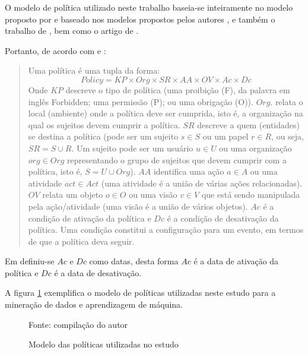 O modelo de política utilizado neste trabalho baseia-se inteiramente no modelo proposto por \cite{sarkis2017} e \cite{sarkis:artigo:2016} baseado nos modelos propostos pelos autores \cite{cuppens_high_2007}, e também o trabalho de \cite{elrakaiby_formal_2012}, bem como o artigo de \cite{kalam_organization_2003}.

Portanto, de acordo com \cite[p.36]{sarkis2017} e \cite{sarkis:artigo:2016}:
\begin{quotation}
	Uma política é uma tupla da forma:
	\begin{equation}\label{politica}
	Policy = KP \times Org \times SR \times AA \times OV \times Ac \times Dc
	\end{equation}
	Onde $ KP $ descreve o tipo de política (uma proibição (F), da palavra em inglês Forbidden; uma permissão (P); ou uma obrigação (O)). $ Org $. relata o local (ambiente) onde a política deve ser cumprida, isto é, a organização na qual os sujeitos devem cumprir a política. $ SR $ descreve a quem (entidades) se destina a política (pode ser um sujeito $ s \in S $ ou um papel $ r \in R $, ou seja, $ SR = S \cup R $. Um sujeito pode ser um usuário $ u \in U $ ou uma organização $ org \in Org $ representando o grupo de sujeitos que devem cumprir com a política, isto é, $ S = U \cup Org $). $ AA $ identifica uma ação $ a \in A  $ ou uma atividade $ act \in Act  $ (uma atividade é a união de várias ações relacionadas). $ OV $ relata um objeto $ o \in O $ ou uma visão $ v \in V $ que está sendo manipulada pela ação/atividade (uma visão é a união de vários objetos). $ Ac $ é a condição de ativação da política e $ Dc $ é a condição de desativação da política. Uma condição constitui a configuração para um evento, em termos de que a política deva seguir. 
\end{quotation}

Em \cite{sarkis2017} definiu-se $ Ac $ e $ Dc $ como datas, desta forma $ Ac $ é a data de ativação da política e $ Dc $ é a data de desativação.

A figura \ref{fig:modelo_politica} exemplifica o modelo de políticas utilizadas neste estudo para a mineração de dados e aprendizagem de máquina.

\begin{figure}[h!]
	\centering
	\caption{Modelo das políticas utilizadas no estudo}
	
	{\scriptsize Fonte: compilação do autor}
	\label{fig:modelo_politica}
\end{figure}

